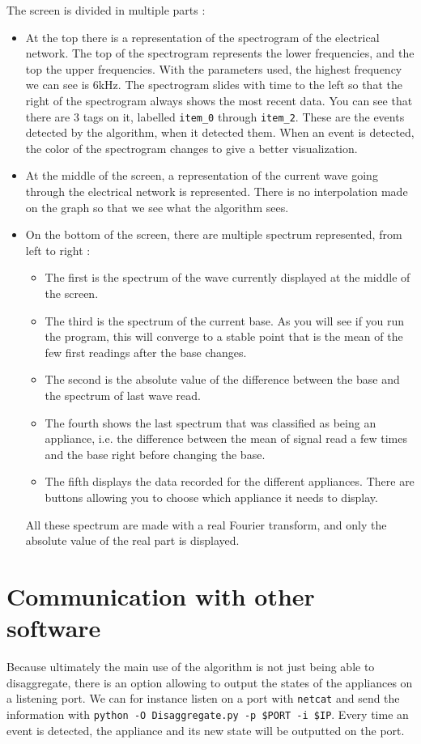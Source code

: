The screen is divided in multiple parts :
\begin{itemize}
    \item At the top there is a representation of the spectrogram of the electrical network. The top of the spectrogram represents the lower frequencies, and the top the upper frequencies. With the parameters used, the highest frequency we can see is 6kHz. The spectrogram slides with time to the left so that the right of the spectrogram always shows the most recent data. You can see that there are 3 tags on it, labelled \texttt{item\_0} through \texttt{item\_2}. These are the events detected by the algorithm, when it detected them. When an event is detected, the color of the spectrogram changes to give a better visualization.
    \item At the middle of the screen, a representation of the current wave going through the electrical network is represented. There is no interpolation made on the graph so that we see what the algorithm sees.
    \item On the bottom of the screen, there are multiple spectrum represented, from left to right :
    \begin{itemize}
        \item The first is the spectrum of the wave currently displayed at the middle of the screen.
        \item The third is the spectrum of the current base. As you will see if you run the program, this will converge to a stable point that is the mean of the few first readings after the base changes.
        \item The second is the absolute value of the difference between the base and the spectrum of last wave read.
        \item The fourth shows the last spectrum that was classified as being an appliance, i.e. the difference between the mean of signal read a few times and the base right before changing the base.
        \item The fifth displays the data recorded for the different appliances. There are buttons allowing you to choose which appliance it needs to display.
    \end{itemize}
    All these spectrum are made with a real Fourier transform, and only the absolute value of the real part is displayed.
\end{itemize}



\section{Communication with other software}
Because ultimately the main use of the algorithm is not just being able to disaggregate, there is an option allowing to output the states of the appliances on a listening port. We can for instance listen on a port with \texttt{netcat} and send the information with \texttt{python -O Disaggregate.py -p \$PORT -i \$IP}. Every time an event is detected, the appliance and its new state will be outputted on the port.

